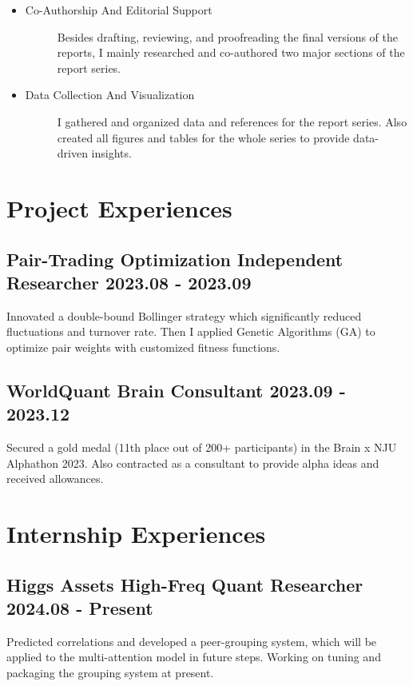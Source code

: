 \documentclass[10.5pt,a4paper]{article}
\begin{document}
\begin{itemize}
    \item \begin{description}
        \item[Co-Authorship And Editorial Support] Besides drafting, reviewing, and proofreading the final versions of the reports, I mainly researched and co-authored two major sections of the report series.
    \end{description}
    \item \begin{description}
        \item[Data Collection And Visualization] I gathered and organized data and references for the report series. Also created all figures and tables for the whole series to provide data-driven insights. 
    \end{description} 
\end{itemize}


\section{Project Experiences} %
\subsection{Pair-Trading Optimization \normalfont \hfill Independent Researcher \hspace{40pt} 2023.08 - 2023.09}
Innovated a double-bound Bollinger strategy which significantly reduced fluctuations and turnover rate. Then I applied Genetic Algorithms (GA) to optimize pair weights with customized fitness functions.

\subsection{WorldQuant Brain \normalfont \hfill Consultant\hspace{40pt} 2023.09 - 2023.12}
Secured a gold medal (11th place out of 200+ participants) in the Brain x NJU Alphathon 2023. Also contracted as a consultant to provide alpha ideas and received allowances.

\section{Internship Experiences} %
\subsection{Higgs Assets \normalfont \hfill High-Freq Quant Researcher \hspace{40pt} 2024.08 - Present}
Predicted correlations and developed a peer-grouping system, which will be applied to the multi-attention model in future steps. Working on tuning and packaging the grouping system at present.
\end{document}
